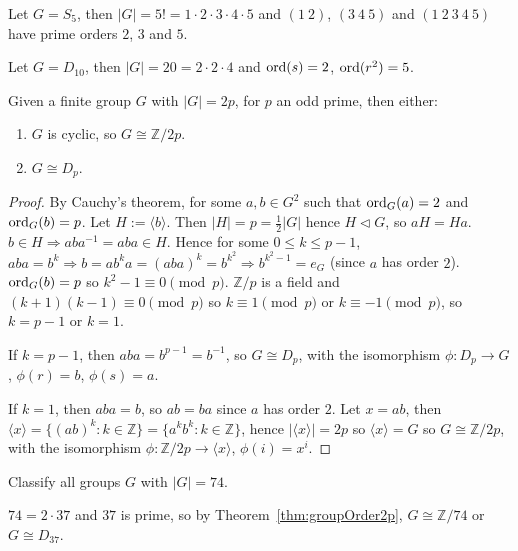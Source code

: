 \begin{example}
	Let $G = S_5$, then $|G| = 5! = 1 \cdot 2 \cdot 3 \cdot 4 \cdot 5$ and $(1 \ 2)$, $(3 \ 4 \ 5)$ and $(1 \ 2 \ 3 \ 4 \ 5)$ have prime orders $2$, $3$ and $5$.
\end{example}

\begin{example}
	Let $G = D_{10}$, then $|G| = 20 = 2 \cdot 2 \cdot 4$ and $\text{ord}(s) = 2$, $\text{ord}(r^2) = 5$.
\end{example}

\begin{theorem}\label{thm:groupOrder2p}
	Given a finite group $G$ with $|G| = 2p$, for $p$ an odd prime, then either:
	\begin{enumerate}
		\item $G$ is cyclic, so $G \cong \mathbb{Z} / 2p$.
		\item $G \cong D_p$.
	\end{enumerate}
\end{theorem}

\begin{proof}
	By Cauchy's theorem, for some $a, b \in G^2$ such that $\text{ord}_G(a) = 2$ and $\text{ord}_G(b) = p$. Let $H := \langle b \rangle$. Then $|H| = p = \frac{1}{2} |G|$ hence $H \triangleleft G$, so $aH = Ha$. $b \in H \Longrightarrow aba^{-1} = aba \in H$. Hence for some $0 \le k \le p - 1$, $aba = b^k \Longrightarrow b = a b^k a = {(aba)}^k = b^{k^2} \Longrightarrow b^{k^2 - 1} = e_G$ (since $a$ has order $2$). $\text{ord}_G(b) = p$ so $k^2 - 1 \equiv 0 \pmod{p}$. $\mathbb{Z} / p$ is a field and $(k + 1)(k - 1) \equiv 0 \pmod{p}$ so $k \equiv 1 \pmod{p}$ or $k \equiv -1 \pmod{p}$, so $k = p - 1$ or $k = 1$.

	If $k = p - 1$, then $aba = b^{p - 1} = b^{-1}$, so $G \cong D_p$, with the isomorphism $\phi: D_p \to G$, $\phi(r) = b$, $\phi(s) = a$.

	If $k = 1$, then $aba = b$, so $ab = ba$ since $a$ has order $2$. Let $x = ab$, then $\langle x \rangle = \{ {(ab)}^k: k \in \mathbb{Z} \} = \{ a^k b^k: k \in \mathbb{Z} \}$, hence $|\langle x \rangle| = 2p$ so $\langle x \rangle = G$ so $G \cong \mathbb{Z} / 2p$, with the isomorphism $\phi: \mathbb{Z} / 2p \to \langle x \rangle$, $\phi(i) = x^i$.
\end{proof}

\begin{example}
	Classify all groups $G$ with $|G| = 74$.

	$74 = 2 \cdot 37$ and $37$ is prime, so by Theorem~\ref{thm:groupOrder2p}, $G \cong \mathbb{Z} / 74$ or $G \cong D_{37}$.
\end{example}

